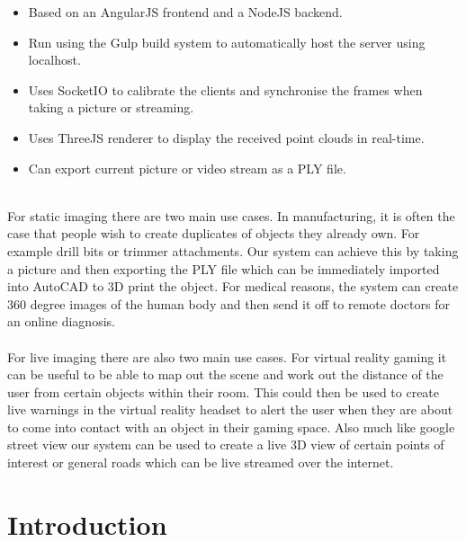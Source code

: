 \documentclass{article}
\begin{document}
\begin{itemize}
\item Based on an AngularJS frontend and a NodeJS backend.
\item Run using the Gulp build system to automatically host the server using localhost.
\item Uses SocketIO to calibrate the clients and synchronise the frames when taking a picture or streaming.
\item Uses ThreeJS renderer to display the received point clouds in real-time.
\item Can export current picture or video stream as a PLY file.
\end{itemize}
~\\
For static imaging there are two main use cases. In manufacturing, it is often the case that people wish to create duplicates of objects they already own. For example drill bits or trimmer attachments. Our system can achieve this by taking a picture and then exporting the PLY file which can be immediately imported into AutoCAD to 3D print the object. For medical reasons, the system can create 360 degree images of the human body and then send it off to remote doctors for an online diagnosis.
\\\\
For live imaging there are also two main use cases. For virtual reality gaming it can be useful to be able to map out the scene and work out the distance of the user from certain objects within their room. This could then be used to create live warnings in the virtual reality headset to alert the user when they are about to come into contact with an object in their gaming space. Also much like google street view our system can be used to create a live 3D view of certain points of interest or general roads which can be live streamed over the internet.

\newpage
\section{Introduction}
\end{document}
